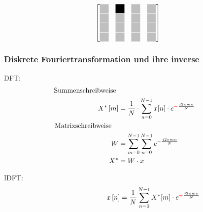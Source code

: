 \begin{frame}
\begin{center}
\begin{figure}[ht!]
\begin{minipage}{0.3\textwidth}
\begingroup
\renewcommand*{\arraystretch}{1.1} %
\renewcommand*{\arraycolsep}{0.8pt} %
\begin{align*}
   \begin{bmatrix}
    \tikzmark{varrowtopleft} \myLightgrayBox 	& \myBlackBox		& \myLightgrayBox 	& \tikzmark{varrowtopright} \myLightgrayBox \\
                             \myLightgrayBox 	& \myLightgrayBox 	& \myLightgrayBox 	& \myLightgrayBox \\
                             \myLightgrayBox 	& \myLightgrayBox 	& \myLightgrayBox 	& \myLightgrayBox \\
    \tikzmark{varrowbottom}  \myLightgrayBox 	& \myLightgrayBox 	& \myLightgrayBox 	& \myLightgrayBox 
   \end{bmatrix}
 \end{align*} 
 \endgroup
\end{minipage}

\label{fig:grafikMatrizenmultiplikation}
\end{figure}
\end{center}
\end{frame}


\begin{frame}\frametitle{Diskrete Fouriertransformation und ihre inverse}


\vspace{0.5cm}
\hspace{1cm}
DFT:
\begin{align*}\label{eq:dft}
\textrm{Summenschreibweise\,\,}\\
 X^* \left[ m \right] &= \frac{1}{N} \cdot \sum^{N-1}_{n=0} x[n] \cdot e^{\textcolor{red}{-}\frac{j 2 \pi m n}{N}}\\
 \textrm{Matrixschreibweise\quad}\\
 W &= \sum_{m=0}^{N-1} \sum_{n=0}^{N-1} e^{-\frac{j 2 \pi m n}{N}}\\
  X^* &= W \cdot x
\end{align*}

\medskip
\pause
\hspace{1cm}
IDFT:
\begin{equation*}\label{eq:idft}
\quad \quad \quad \quad \quad \quad \quad \,\, x \left[ n \right] = \frac{1}{N} \sum^{N-1}_{n=0} X^*[m] \cdot e^{\textcolor{red}{+}\frac{j 2 \pi m n}{N}}
\end{equation*}

\end{frame}



